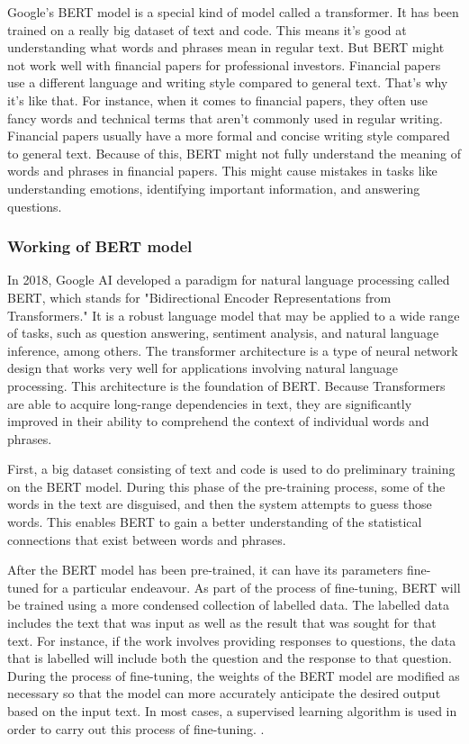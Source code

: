 \documentclass[12pt, a4paper,twoside]{report}
\theoremstyle{plain} %
\theoremstyle{definition} %
\theoremstyle{remark} %
\numberwithin{equation}{chapter}
\begin{document}
    Google's BERT model is a special kind of model called a transformer. It has been trained on a really big dataset of text and code. This means it's good at understanding what words and phrases mean in regular text. But BERT might not work well with financial papers for professional investors. Financial papers use a different language and writing style compared to general text. That's why it's like that. For instance, when it comes to financial papers, they often use fancy words and technical terms that aren't commonly used in regular writing. Financial papers usually have a more formal and concise writing style compared to general text. Because of this, BERT might not fully understand the meaning of words and phrases in financial papers. This might cause mistakes in tasks like understanding emotions, identifying important information, and answering questions.


        \subsubsection{Working of BERT model}
        
       In 2018, Google AI developed a paradigm for natural language processing called BERT, which stands for "Bidirectional Encoder Representations from Transformers." It is a robust language model that may be applied to a wide range of tasks, such as question answering, sentiment analysis, and natural language inference, among others. The transformer architecture is a type of neural network design that works very well for applications involving natural language processing. This architecture is the foundation of BERT. Because Transformers are able to acquire long-range dependencies in text, they are significantly improved in their ability to comprehend the context of individual words and phrases. 
       
       First, a big dataset consisting of text and code is used to do preliminary training on the BERT model. During this phase of the pre-training process, some of the words in the text are disguised, and then the system attempts to guess those words. This enables BERT to gain a better understanding of the statistical connections that exist between words and phrases.
       
        After the BERT model has been pre-trained, it can have its parameters fine-tuned for a particular endeavour. As part of the process of fine-tuning, BERT will be trained using a more condensed collection of labelled data. The labelled data includes the text that was input as well as the result that was sought for that text. For instance, if the work involves providing responses to questions, the data that is labelled will include both the question and the response to that question.
        During the process of fine-tuning, the weights of the BERT model are modified as necessary so that the model can more accurately anticipate the desired output based on the input text. In most cases, a supervised learning algorithm is used in order to carry out this process of fine-tuning. \cite{BERT}.
\end{document}
